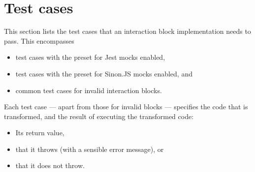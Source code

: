 \section*{Test cases}
This section lists the test cases that
an interaction block implementation needs to pass.
This encompasses
\begin{itemize}
  \item test cases with the preset for Jest mocks enabled,
  \item test cases with the preset for Sinon.JS mocks enabled, and
  \item common test cases for invalid interaction blocks.
\end{itemize}

Each test case
--- apart from those for invalid blocks ---
specifies the code that is transformed,
and the result of executing the transformed code:
\begin{itemize}
  \item Its return value,
  \item that it throws (with a sensible error message), or
  \item that it does not throw.
\end{itemize}














